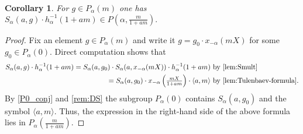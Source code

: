 \documentclass[oneside, 8pt]{amsart}
\newtheorem{corollary}[lemma]{Corollary}
\theoremstyle{remark}
\theoremstyle{definition}
\numberwithin{lemma}{section}
\numberwithin{prop}{section}
\numberwithin{corollary}{section}
\numberwithin{externaltheorem}{section}
\numberwithin{equation}{section}
\begin{document}
\begin{corollary}\label{SR:additivity} For $g \in P_\alpha(m)$ one has $S_\alpha(a, g) \cdot h_\alpha^{-1}(1 + am) \in P(\alpha, \tfrac{m}{1 + am}).$
\end{corollary} \begin{proof}
Fix an element $g \in P_\alpha(m)$ and write it $g = g_0 \cdot x_{-\alpha}(mX)$ for some $g_0 \in P_\alpha(0)$.
Direct computation shows that
\begin{align*}
 S_\alpha(a, g) \cdot h_{\alpha}^{-1}(1+am) = S_\alpha(a, g_0) \cdot S_\alpha(a, x_{-\alpha}(mX)) \cdot h_{\alpha}^{-1}(1+am)&\text{ by~\cref{lem:Smult}} \\\
 = S_\alpha(a, g_0) \cdot x_{-\alpha}\left(\tfrac{mX}{1+am}\right) \cdot\langle a, m \rangle &\text{ by~\cref{lem:Tulenbaev-formula}.}
\end{align*}
By \cref{P0_conj} and \cref{rem:DS} the subgroup $P_\alpha(0)$ contains $S_\alpha(a, g_0)$ and the symbol $\langle a, m \rangle$. Thus, the expression in the right-hand side of the above formula lies in $P_\alpha\left(\tfrac{m}{1+am}\right)$. 
\end{proof}
\begin{comment}
\begin{corollary}\label{cor:additivity} For $a, b \in A$ and $g \in P_\alpha(m)$ one has
 \[S_\alpha(a + b, g) = S_\alpha\left(b, S_\alpha(a, g) \cdot h_\alpha^{-1}(1+am)\right) \cdot h_\alpha(1+am).\]
\end{corollary}
\begin{proof}
The assertion immediately follows from the above corollary:
 \begin{align*}
  S_\alpha\left(b, S_\alpha(a, g) \cdot h_\alpha^{-1}(1+am)\right) \cdot h_\alpha(1+am) &\text{ by~\eqref{eq:S-def}} \\
  = x_\alpha(bX^{-1}) \cdot S_\alpha(a, g) \cdot h_\alpha^{-1}(1+am) \cdot x_\alpha\left(-\tfrac{bX^{-1}}{1+\tfrac{bm}{1+am}}\right) \cdot \{X, 1+\tfrac{bm}{1+am}\} \cdot h_\alpha(1+am)&\text{ by~\eqref{eq:conj-h-x}} \\
  = x_\alpha(bX^{-1}) \cdot S_\alpha(a, g) \cdot x_\alpha\left(\tfrac{-bX^{-1}}{(1+am)(1+am+bm)}\right) \cdot \left\{X, 1+\tfrac{bm}{1+am} \right\}&\text{ by~\eqref{eq:S-def}}\\
  = x_\alpha((a+b)X^{-1}) \cdot h \cdot x_\alpha\left(- \tfrac{aX^{-1}(1+am+bm) + bX^{-1}}{(1+am)(1+am+bm)} \right) \cdot \{ X, 1+(a+b)m \} = S_\alpha(a+b, g) &\text{ by~\eqref{eq:S-def}.} \end{align*}
\end{proof}
\end{comment}
\end{document}
